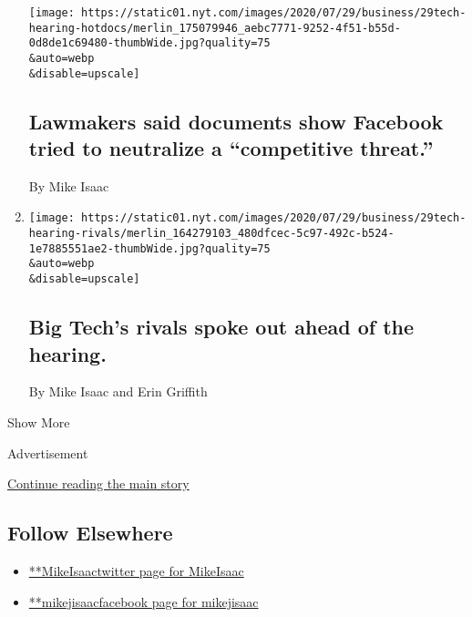 \begin{enumerate}
  \texttt{[image: https://static01.nyt.com/images/2020/07/29/business/29tech-hearing-hotdocs/merlin\_175079946\_aebc7771-9252-4f51-b55d-0d8de1c69480-thumbWide.jpg?quality=75\\\&auto=webp\\\&disable=upscale]}

  \hypertarget{lawmakers-said-documents-show-facebook-tried-to-neutralize-a-competitive-threat}{%
  \subsection{Lawmakers said documents show Facebook tried to neutralize
  a ``competitive
  threat.''}\label{lawmakers-said-documents-show-facebook-tried-to-neutralize-a-competitive-threat}}

  By Mike Isaac
\item
  \href{/live/2020/07/29/technology/tech-ceos-hearing-testimony/big-techs-rivals-spoke-out-ahead-of-the-hearing}{}

  \texttt{[image: https://static01.nyt.com/images/2020/07/29/business/29tech-hearing-rivals/merlin\_164279103\_480dfcec-5c97-492c-b524-1e7885551ae2-thumbWide.jpg?quality=75\\\&auto=webp\\\&disable=upscale]}

  \hypertarget{big-techs-rivals-spoke-out-ahead-of-the-hearing}{%
  \subsection{Big Tech's rivals spoke out ahead of the
  hearing.}\label{big-techs-rivals-spoke-out-ahead-of-the-hearing}}

  By Mike Isaac and Erin Griffith
\end{enumerate}

Show More

Advertisement

\protect\hyperlink{after-mid2}{Continue reading the main story}

\hypertarget{follow-elsewhere}{%
\subsection{Follow Elsewhere}\label{follow-elsewhere}}

\begin{itemize}
\tightlist
\item
  \href{https://twitter.com/MikeIsaac}{**MikeIsaactwitter page for
  MikeIsaac}
\item
  \href{https://www.facebook.com/mikejisaac}{**mikejisaacfacebook page
  for mikejisaac}
\end{itemize}


